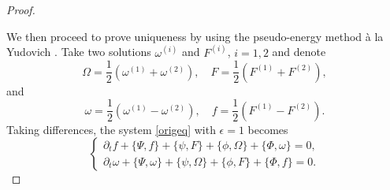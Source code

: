 \documentclass[11pt,reqno]{amsproc}
\newcommand{\pa}{\partial}
\newcommand{\la}{\label}
\newcommand{\fr}{\frac}
\newcommand{\be}{\begin{equation}}
\newcommand{\ee}{\end{equation}}
\newcommand{\ba}{\begin{array}{l}}
\newcommand{\ea}{\end{array}}
\newcommand{\B}{\mathbb{B}}
\newcommand{\U}{\mathbb{U}}
\newcommand{\V}{\mathbb{V}}
\begin{document}
\begin{proof}
\begin{enumerate}
\end{enumerate}
We then proceed to prove uniqueness by using the pseudo-energy method à la Yudovich \cite{yudovich}. Take two solutions $\omega^{(i)}$ and $F^{(i)}$, $i=1,2$ and denote
\[
\Omega = \fr{1}{2}( \omega^{(1)} + \omega^{(2)}), \quad F = \fr{1}{2}( F^{(1)} + F^{(2)}),
\]
and
\[
\omega = \fr{1}{2}( \omega^{(1)} - \omega^{(2)}), \quad f = \fr{1}{2}( F^{(1)} - F^{(2)}).
\]
Taking differences, the system \eqref{origeq}  with $\epsilon=1$ becomes
\be
\left\{
\ba
\pa_t f +\{ \Psi, f\} + \{\psi, F\} + \{\phi, \Omega\} + \{\Phi, \omega\} = 0,\\
\pa_t \omega + \{ \Psi, \omega\} + \{\psi, \Omega\} + \{\phi, F\} + \{\Phi, f\} = 0.
\ea
\right.
\la{difforig}
\ee


\end{proof}
\end{document}
